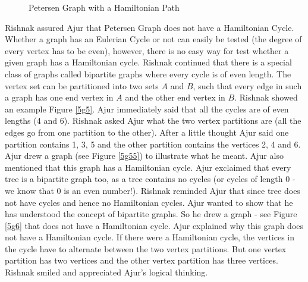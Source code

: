\begin{figure}
\begin{center}
\caption{ Petersen Graph with a Hamiltonian Path}\label{5g4}
\end{center}
\end{figure}
Rishnak assured Ajur that Petersen Graph does not have a Hamiltonian Cycle. Whether a graph has an Eulerian Cycle or not can easily be tested (the degree of every vertex has to be even), however, there is no easy way for test whether a given graph has a Hamiltonian cycle. 
Rishnak continued that there is a special class of graphs called bipartite graphs where every cycle is of even length. The vertex set can be partitioned into two sets $A$ and $B$, such that every edge in such a graph has one end vertex in $A$ and the other end vertex in $B$. Rishnak showed an example Figure \ref{5g5}. Ajur immediately said that all the cycles are of even lengths (4 and 6). Rishnak asked Ajur what the two vertex partitions are (all the edges go from one partition to the other). After a little thought Ajur said one partition contains 1, 3, 5 and the other partition contains the vertices 2, 4 and 6. Ajur drew a graph (see Figure \ref{5g55}) to illustrate  what he meant. Ajur also mentioned that this graph has a Hamiltonian cycle. Ajur exclaimed that every tree is a bipartite graph too, as a tree contains no cycles (or cycles of length 0 - we know that 0 is an even number!). Rishnak reminded Ajur that since tree does not have cycles and hence no Hamiltonian cycles. 
Ajur wanted to show that he has understood the concept of bipartite graphs. So he drew a graph - see Figure \ref{5g6} that does not have a Hamiltonian cycle. Ajur explained why this graph does not have a Hamiltonian cycle. If there were a Hamiltonian cycle, the vertices in the cycle have to alternate between the two vertex partitions. But one vertex partition has two vertices and the other vertex partition has three vertices. Rishnak smiled and appreciated Ajur's logical thinking.


